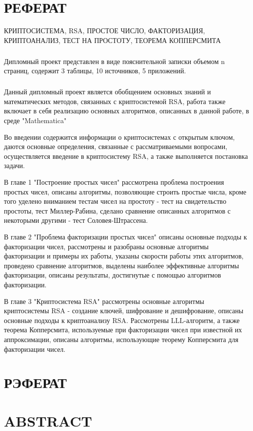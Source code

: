 
\newpage
\chapter*{РЕФЕРАТ}

КРИПТОСИСТЕМА, RSA, ПРОСТОЕ ЧИСЛО, ФАКТОРИЗАЦИЯ, КРИПТОАНАЛИЗ, ТЕСТ НА ПРОСТОТУ, ТЕОРЕМА КОППЕРСМИТА

\paragraph{} Дипломный проект представлен в виде пояснительной записки объемом n страниц, содержит 3 таблицы, 10 источников, 5 приложений.

\paragraph{} Данный дипломный проект является обобщением основных знаний и математических методов, связанных с криптосистемой RSA, работа также
	включает в себя реализацию основных алгоритмов, описанных в данной работе, в среде "Mathematica"

	Во введении содержится информации о криптосистемах с открытым ключом, даются основные определения, связанные с рассматриваемыми вопросами,
	осуществляется введение в криптосистему RSA, а также выполняется постановка задачи.

	В главе 1 "Построение простых чисел" рассмотрена проблема построения простых чисел, описаны алгоритмы, позволяющие строить простые числа, 
	кроме того уделено вниманием тестам чисел на простоту - тест на свидетельство простоты, тест Миллер-Рабина, сделано сравнение описанных алгоритмов
	с некоторыми другими - тест Соловея-Штрассена.

	В главе 2 "Проблема факторизации простых чисел" описаны основные подходы к факторизации чисел, рассмотрены и разобраны основные алгоритмы факторизации и примеры их работы, указаны скорости работы этих алгоритмов, проведено сравнение алгоритмов, выделены наиболее эффективные алгоритмы факторизации, описаны результаты, достигнутые с помощью алгоритмов факторизации.

	В главе 3 "Криптосистема RSA" рассмотрены основные алгоритмы криптосистемы RSA - создание ключей, шифрование и дешифрование, описаны основные
	подходы к криптоанализу RSA. Рассмотрены LLL-алгоритм, а также теорема Копперсмита, используемые при факторизации чисел при известной их 
	аппроксимации, описаны алгоритмы, использующие теорему Копперсмита для факторизации чисел.

\newpage
\chapter*{РЭФЕРАТ}

\newpage
\chapter*{ABSTRACT}
